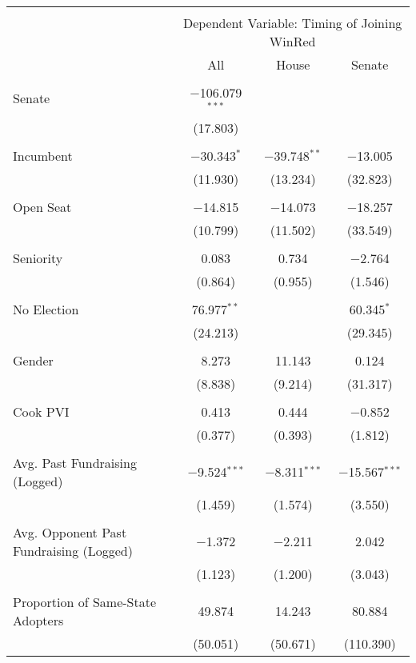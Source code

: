 
\begin{tabular}{@{\extracolsep{5pt}}lccc} 
\\[-1.8ex]\hline 
\hline \\[-1.8ex] 
 & \multicolumn{3}{c}{Dependent Variable: Timing of Joining WinRed} \\ 
\cline{2-4} 
 & All & House & Senate \\ 
\hline \\[-1.8ex] 
 Senate & $-$106.079$^{***}$ &  &  \\ 
  & (17.803) &  &  \\ 
  & & & \\ 
 Incumbent & $-$30.343$^{*}$ & $-$39.748$^{**}$ & $-$13.005 \\ 
  & (11.930) & (13.234) & (32.823) \\ 
  & & & \\ 
 Open Seat & $-$14.815 & $-$14.073 & $-$18.257 \\ 
  & (10.799) & (11.502) & (33.549) \\ 
  & & & \\ 
 Seniority & 0.083 & 0.734 & $-$2.764 \\ 
  & (0.864) & (0.955) & (1.546) \\ 
  & & & \\ 
 No Election & 76.977$^{**}$ &  & 60.345$^{*}$ \\ 
  & (24.213) &  & (29.345) \\ 
  & & & \\ 
 Gender & 8.273 & 11.143 & 0.124 \\ 
  & (8.838) & (9.214) & (31.317) \\ 
  & & & \\ 
 Cook PVI & 0.413 & 0.444 & $-$0.852 \\ 
  & (0.377) & (0.393) & (1.812) \\ 
  & & & \\ 
 Avg. Past Fundraising (Logged) & $-$9.524$^{***}$ & $-$8.311$^{***}$ & $-$15.567$^{***}$ \\ 
  & (1.459) & (1.574) & (3.550) \\ 
  & & & \\ 
 Avg. Opponent Past Fundraising (Logged) & $-$1.372 & $-$2.211 & 2.042 \\ 
  & (1.123) & (1.200) & (3.043) \\ 
  & & & \\ 
 Proportion of Same-State Adopters & 49.874 & 14.243 & 80.884 \\ 
  & (50.051) & (50.671) & (110.390) \\ 

\end{tabular}

